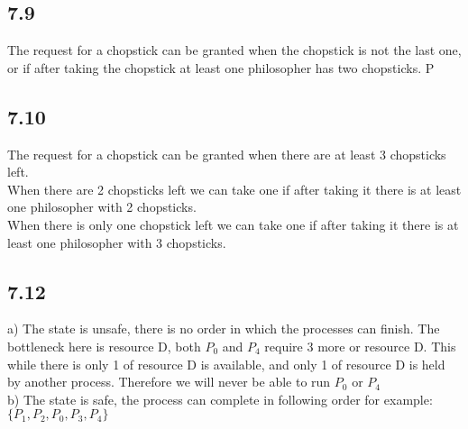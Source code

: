 \documentclass[]{article}
\begin{document}
\subsection*{7.9}

The request for a chopstick can be granted when the chopstick is not the last one, or if after taking the chopstick at least one philosopher has two chopsticks.
P
\subsection*{7.10}

The request for a chopstick can be granted when there are at least 3 chopsticks left.\\
When there are 2 chopsticks left we can take one if after taking it there is at least one philosopher with 2 chopsticks.\\
When there is only one chopstick left we can take one if after taking it there is at least one philosopher with 3 chopsticks.\\

\subsection*{7.12}

a) The state is unsafe, there is no order in which the processes can finish. The bottleneck here is resource D, both $P_0$ and $P_4$ require 3 more or resource D. This while there is only 1 of resource D is available, and only 1 of resource D is held by another process. Therefore we will never be able to run $P_0$ or $P_4$\\

b) The state is safe, the process can complete in following order for example: $\{P_1, P_2, P_0, P_3, P_4\}$
\end{document}
